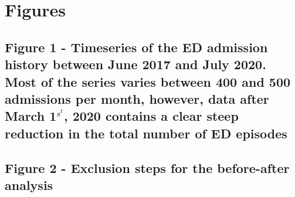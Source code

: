 \documentclass{bmcart}
\begin{document}



\section*{Figures}

\subsection*{Figure 1 - Timeseries of the ED admission history between June 2017 and July 2020. Most of the series varies between 400 and 500 admissions per month, however, data after March 1$^s^t$, 2020 contains a clear steep reduction in the total number of ED episodes}

\subsection*{Figure 2 - Exclusion steps for the before-after analysis}

\\


\end{document}
